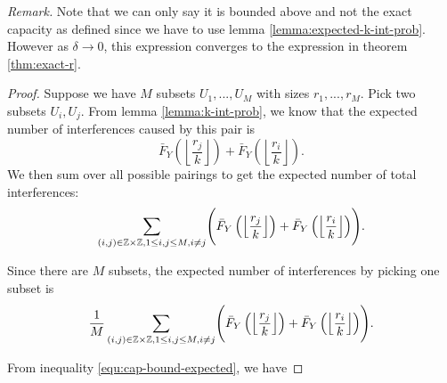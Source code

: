 \textit{Remark.} Note that we can only say it is bounded above and not the exact capacity as defined since we have to use lemma \ref{lemma:expected-k-int-prob}. However as $\delta \to 0$, this expression converges to the expression in theorem \ref{thm:exact-r}. 

\begin{proof}

    Suppose we have $M$ subsets $U_1,...,U_M$ with sizes $r_1,...,r_M$. Pick two subsets $U_i,U_j$. From lemma \ref{lemma:k-int-prob}, we know that the expected number of interferences caused by this pair is
    $$
    \bar{F}_Y\left(\left\lfloor \frac{r_j}{k} \right\rfloor\right) + \bar{F}_Y\left(\left\lfloor \frac{r_i}{k} \right\rfloor\right).
    $$
    We then sum over all possible pairings to get the expected number of total interferences:
    $$
    \sum_{(i,j) \in \mathbb{Z}\times\mathbb{Z}, 1 \le i,j \le M, i \ne j} \Biggl( \bar{F}_Y\left(\left\lfloor \frac{r_j}{k} \right\rfloor\right) + \bar{F}_Y\left(\left\lfloor \frac{r_i}{k} \right\rfloor\right) \Biggr).
    $$

\noindent Since there are $M$ subsets, the expected number of interferences by picking one subset is
    $$
    \frac{1}{M} \sum_{(i,j) \in \mathbb{Z}\times\mathbb{Z}, 1 \le i,j \le M, i \ne j}  \Biggl( \bar{F}_Y\left(\left\lfloor \frac{r_j}{k} \right\rfloor\right) + \bar{F}_Y\left(\left\lfloor \frac{r_i}{k} \right\rfloor\right) \Biggr).
    $$

\noindent From inequality \ref{equ:cap-bound-expected}, we have 


\end{proof}
